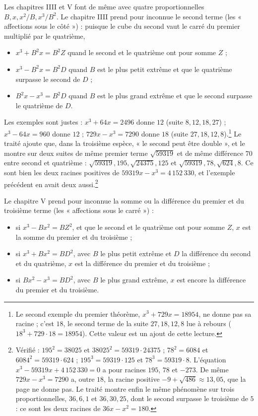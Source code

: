 \documentclass[11pt,a4paper]{article}
\begin{document}
Les chapitres IIII et V font de même avec quatre proportionnelles
$B, x, x^2/B, x^3/B^2$. Le chapitre IIII prend pour inconnue le second terme
(les « affections sous le côté ») : puisque le cube du second vaut le carré du
premier multiplié par le quatrième,

\begin{itemize}
  \item $x^3 + B^2x = B^2Z$ quand le second et le quatrième ont pour somme $Z$ ;
  \item $x^3 - B^2x = B^2D$ quand $B$ est le plus petit extrême et que le
    quatrième surpasse le second de $D$ ;
  \item $B^2x - x^3 = B^2D$ quand $B$ est le plus grand extrême et que le second
    surpasse le quatrième de $D$.
\end{itemize}

Les exemples sont justes : $x^3 + 64x = 2496$ donne $12$ (suite $8, 12, 18,
27$) ; $x^3 - 64x = 960$ donne $12$ ; $729x - x^3 = 7290$ donne $18$ (suite
$27, 18, 12, 8$).\footnote{Le second exemple du premier théorème,
$x^3 + 729x = 18954$, ne donne pas sa racine ; c'est $18$, le second terme de la
suite $27, 18, 12, 8$ lue à rebours ($18^3 + 729 \cdot 18 = 18954$). Cette valeur
est un ajout de cette lecture.} Le traité ajoute que, dans la troisième espèce,
« le second peut être double », et le montre sur deux suites de même premier
terme $\sqrt{59319}$ et de même différence $70$ entre second et quatrième :
$\sqrt{59319}, 195, \sqrt{24375}, 125$ et $\sqrt{59319}, 78, \sqrt{624}, 8$. Ce
sont bien les deux racines positives de $59319x - x^3 = 4\,152\,330$, et
l'exemple précédent en avait deux aussi.\footnote{Vérifié : $195^2 = 38025$ et
$38025^2 = 59319 \cdot 24375$ ; $78^2 = 6084$ et $6084^2 = 59319 \cdot 624$ ;
$195^3 = 59319 \cdot 125$ et $78^3 = 59319 \cdot 8$. L'équation
$x^3 - 59319x + 4\,152\,330 = 0$ a pour racines $195$, $78$ et $-273$. De même
$729x - x^3 = 7290$ a, outre $18$, la racine positive $-9 + \sqrt{486} \approx
13{,}05$, que la page ne donne pas. Le traité montre enfin le même phénomène sur
trois proportionnelles, $36, 6, 1$ et $36, 30, 25$, dont le second surpasse le
troisième de $5$ : ce sont les deux racines de $36x - x^2 = 180$.}

Le chapitre V prend pour inconnue la somme ou la différence du premier et du
troisième terme (les « affections sous le carré ») :

\begin{itemize}
  \item si $x^3 - Bx^2 = BZ^2$, et que le second et le quatrième ont pour somme
    $Z$, $x$ est la somme du premier et du troisième ;
  \item si $x^3 + Bx^2 = BD^2$, avec $B$ le plus petit extrême et $D$ la
    différence du second et du quatrième, $x$ est la différence du premier et du
    troisième ;
  \item si $Bx^2 - x^3 = BD^2$, avec $B$ le plus grand extrême, $x$ est encore
    la différence du premier et du troisième.
\end{itemize}
\end{document}
